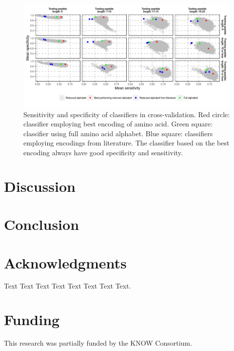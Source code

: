 \documentclass{bioinfo}
\begin{document}
\begin{figure}[!tpb]
\centerline{\includegraphics{figures/sesp_plot.png}}
\caption{Sensitivity and specificity of classifiers in cross-validation. Red circle: classifier employing best encoding of amino acid. Green square: classifier using full amino acid alphabet. Blue square: classifiers employing encodings from literature. The classifier based on the best encoding always have good specificity and sensitivity.}\label{fig:sesp_plot}
\end{figure}


\section{Discussion}









%
%






\section{Conclusion}



\section*{Acknowledgments}

Text Text Text Text Text Text  Text Text. 

\section*{Funding}

This research was partially funded by the KNOW Consortium.


%
%
%
%
%
%
%

\end{document}
